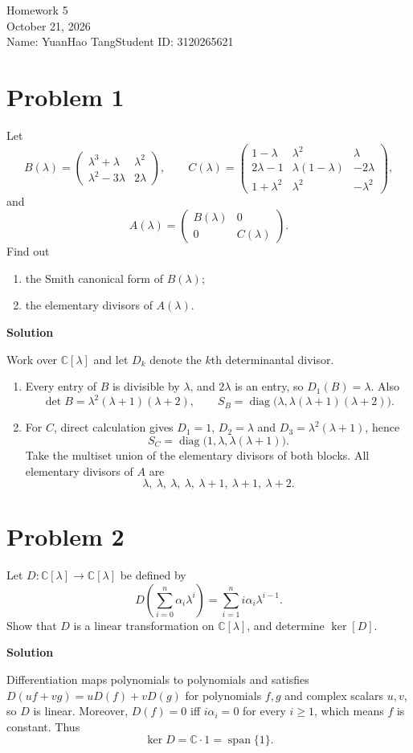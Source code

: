 \documentclass[UTF8,10pt,letterpaper,fontset=fandol]{ctexart}
\newcommand{\C}{\mathbb C}
\newcommand{\Solution}{\par\Needspace{4\baselineskip}\textbf{Solution}\par}
\begin{document}
\begin{center}
{\LARGE Homework 5}\\[0.6em]
October 21, 2026\\[0.25em]
Name: YuanHao Tang\quad Student ID: 3120265621
\end{center}

\section{Problem 1}
Let
\[
B(\lambda)=\begin{pmatrix}\lambda^3+\lambda&\lambda^2\\\lambda^2-3\lambda&2\lambda\end{pmatrix},\qquad
C(\lambda)=\begin{pmatrix}
1-\lambda&\lambda^2&\lambda\\
2\lambda-1&\lambda(1-\lambda)&-2\lambda\\
1+\lambda^2&\lambda^2&-\lambda^2
\end{pmatrix},
\]
and
\[
A(\lambda)=\begin{pmatrix}B(\lambda)&0\\0&C(\lambda)\end{pmatrix}.
\]
Find out
\begin{enumerate}
\item the Smith canonical form of $B(\lambda)$;
\item the elementary divisors of $A(\lambda)$.
\end{enumerate}
\Solution
Work over $\C[\lambda]$ and let $D_k$ denote the $k$th determinantal divisor.
\begin{enumerate}
\item Every entry of $B$ is divisible by $\lambda$, and $2\lambda$ is an entry, so $D_1(B)=\lambda$. Also
\[
\det B=\lambda^2(\lambda+1)(\lambda+2),
\qquad\boxed{S_B=\operatorname{diag}\bigl(\lambda,\lambda(\lambda+1)(\lambda+2)\bigr)}.
\]
\item For $C$, direct calculation gives $D_1=1$, $D_2=\lambda$ and $D_3=\lambda^2(\lambda+1)$, hence
\[
S_C=\operatorname{diag}\bigl(1,\lambda,\lambda(\lambda+1)\bigr).
\]
Take the multiset union of the elementary divisors of both blocks. All elementary divisors of $A$ are
\[
\boxed{\lambda,\ \lambda,\ \lambda,\ \lambda,\ \lambda+1,\ \lambda+1,\ \lambda+2}.
\]
\end{enumerate}

\section{Problem 2}
Let $D:\C[\lambda]\to\C[\lambda]$ be defined by
\[
D\!\left(\sum_{i=0}^n\alpha_i\lambda^i\right)=\sum_{i=1}^n i\alpha_i\lambda^{i-1}.
\]
Show that $D$ is a linear transformation on $\C[\lambda]$, and determine $\ker[D]$.
\Solution
Differentiation maps polynomials to polynomials and satisfies
$D(uf+vg)=uD(f)+vD(g)$ for polynomials $f,g$ and complex scalars $u,v$, so $D$ is linear.
Moreover, $D(f)=0$ iff $i\alpha_i=0$ for every $i\ge1$, which means $f$ is constant. Thus
\[
\boxed{\ker D=\C\cdot1=\operatorname{span}\{1\}}.
\]
\end{document}
